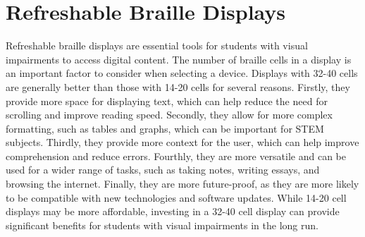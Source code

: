 \documentclass[14pt,letterpaper,twoside]{extreport}
\begin{document}
\pagebreak
\hypertarget{refreshable-braille-displays}{}\section{Refreshable Braille
  Displays}\label{refreshable-braille-displays}

Refreshable braille displays are essential tools for students with visual impairments to access digital content. The number of braille cells in a display is an important factor to consider when selecting a device. Displays with 32-40 cells are generally better than those with 14-20 cells for several reasons. Firstly, they provide more space for displaying text, which can help reduce the need for scrolling and improve reading speed. Secondly, they allow for more complex formatting, such as tables and graphs, which can be important for STEM subjects. Thirdly, they provide more context for the user, which can help improve comprehension and reduce errors. Fourthly, they are more versatile and can be used for a wider range of tasks, such as taking notes, writing essays, and browsing the internet. Finally, they are more future-proof, as they are more likely to be compatible with new technologies and software updates. While 14-20 cell displays may be more affordable, investing in a 32-40 cell display can provide significant benefits for students with visual impairments in the long run.
\end{document}

